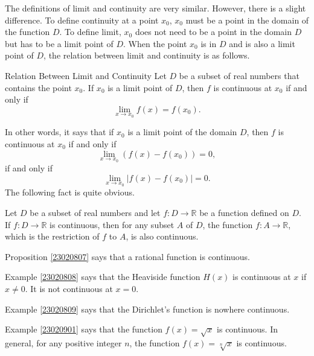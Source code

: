 The  definitions of limit and continuity are very similar. However, there is a slight difference. To define continuity at a point $x_0$, $x_0$ must be a point in the domain of the function $D$. To define limit, $x_0$ does not need to be a point in the domain $D$ but has to be a limit point of $D$.  When the point  $x_0$ is in $D$ and is also a limit point of $D$, the relation between limit and continuity is as follows.
\begin{proposition}
{Relation Between Limit and Continuity}
Let $D$ be a subset of real numbers that contains the point $x_0$. If $x_0$ is a limit point of $D$, then $f$ is continuous at $x_0$ if and only if
\[\lim_{x\rightarrow x_0}f(x)=f(x_0).\]
\end{proposition}

In other words, it says that if $x_0$ is a limit point of the domain $D$, then $f$ is continuous at $x_0$ if and only if 
\[\lim_{x\rightarrow x_0}(f(x)-f(x_0))=0,\]if and only if 
\[\lim_{x\rightarrow x_0}|f(x)-f(x_0)|=0.\]
The following fact is  quite obvious.
\begin{proposition}{}
Let $D$ be a subset of real numbers and let $f:D\rightarrow\mathbb{R}$ be a function defined on $D$. If $f:D\rightarrow \mathbb{R}$ is continuous, then for any subset $A$ of $D$, the function $f:A\rightarrow\mathbb{R}$, which is the restriction of $f$ to $A$, is also continuous.
\end{proposition}

\begin{example}{}
Proposition \ref{23020807} says that a rational function is continuous.
\end{example}

\begin{example}{}
Example \ref{23020808} says that the Heaviside function $H(x)$ is continuous at $x$ if $x\neq 0$. It is not continuous at $x=0$. 
\end{example}

\begin{example}{}
Example \ref{23020809} says that the Dirichlet's function is nowhere continuous.
\end{example}

\begin{example}{}
Example \ref{23020901} says that the function $f(x)=\sqrt{x}$ is continuous. 
In general, for any positive integer $n$, the function $f(x)=\sqrt[n]{x}$ is continuous.
\end{example}

 

